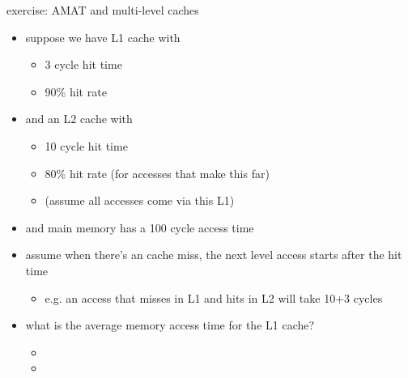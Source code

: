 \begin{frame}{exercise: AMAT and multi-level caches}
\begin{itemize}
\item suppose we have L1 cache with
    \begin{itemize}
    \item 3 cycle hit time
    \item 90\% hit rate
    \end{itemize}
\item and an L2 cache with
    \begin{itemize}
    \item 10 cycle hit time
    \item 80\% hit rate (for accesses that make this far)
    \item (assume all accesses come via this L1)
    \end{itemize}
\item and main memory has a 100 cycle access time
\item assume when there's an cache miss, the next level access starts after the hit time
    \begin{itemize}
    \item e.g. an access that misses in L1 and hits in L2 will take 10+3 cycles
    \end{itemize}
\item what is the average memory access time for the L1 cache?
\begin{itemize}
\item<2-> \iftoggle{heldback}{~}{$3 + 0.1\cdot(\myemph<3>{10 + 0.2\cdot100}) = 6$ cycles}
\item<3-> \iftoggle{heldback}{~}{L1 miss penalty is $10 + 0.2\cdot100 = 30$ cycles}
\end{itemize}
\end{itemize}
\end{frame}

